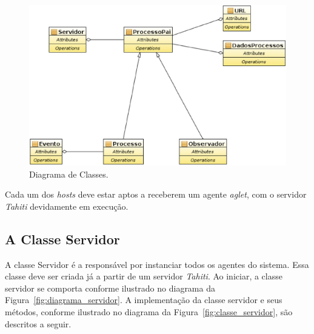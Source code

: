 \begin{figure}[htb]
  \centering
  \centerline{\includegraphics[scale=0.5]{imagens/diagrama_de_classes.eps}}
  \caption{Diagrama de Classes.}
\label{fig:diagrama_classes}
\end{figure}


Cada um dos \textit{hosts} deve estar aptos a receberem um agente \textit{aglet}, com o servidor \textit{Tahiti} devidamente em execução.



\subsection{A Classe Servidor}

A classe Servidor é a responsável por instanciar todos os agentes do sistema. Essa classe deve ser criada já a partir de um servidor \textit{Tahiti}. Ao iniciar, a classe servidor se comporta conforme ilustrado no diagrama da Figura~\ref{fig:diagrama_servidor}. A implementação da classe servidor e seus métodos, conforme ilustrado no diagrama da Figura~\ref{fig:classe_servidor}, são descritos a seguir.



